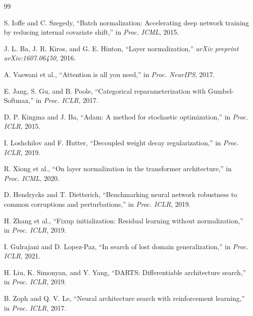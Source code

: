 \documentclass[conference]{IEEEtran}
\begin{document}
\begin{thebibliography}{99}

S. Ioffe and C. Szegedy, ``Batch normalization: Accelerating deep
network training by reducing internal covariate shift,'' in
\textit{Proc. ICML}, 2015.

J. L. Ba, J. R. Kiros, and G. E. Hinton, ``Layer normalization,''
\textit{arXiv preprint arXiv:1607.06450}, 2016.

A. Vaswani et al., ``Attention is all you need,'' in \textit{Proc.
NeurIPS}, 2017.

E. Jang, S. Gu, and B. Poole, ``Categorical reparameterization with
Gumbel-Softmax,'' in \textit{Proc. ICLR}, 2017.

D. P. Kingma and J. Ba, ``Adam: A method for stochastic optimization,''
in \textit{Proc. ICLR}, 2015.

I. Loshchilov and F. Hutter, ``Decoupled weight decay regularization,''
in \textit{Proc. ICLR}, 2019.

R. Xiong et al., ``On layer normalization in the transformer
architecture,'' in \textit{Proc. ICML}, 2020.

D. Hendrycks and T. Dietterich, ``Benchmarking neural network
robustness to common corruptions and perturbations,'' in \textit{Proc.
ICLR}, 2019.

H. Zhang et al., ``Fixup initialization: Residual learning without
normalization,'' in \textit{Proc. ICLR}, 2019.

I. Gulrajani and D. Lopez-Paz, ``In search of lost domain
generalization,'' in \textit{Proc. ICLR}, 2021.

H. Liu, K. Simonyan, and Y. Yang, ``DARTS: Differentiable architecture
search,'' in \textit{Proc. ICLR}, 2019.

B. Zoph and Q. V. Le, ``Neural architecture search with reinforcement
learning,'' in \textit{Proc. ICLR}, 2017.


\end{thebibliography}
\end{document}
